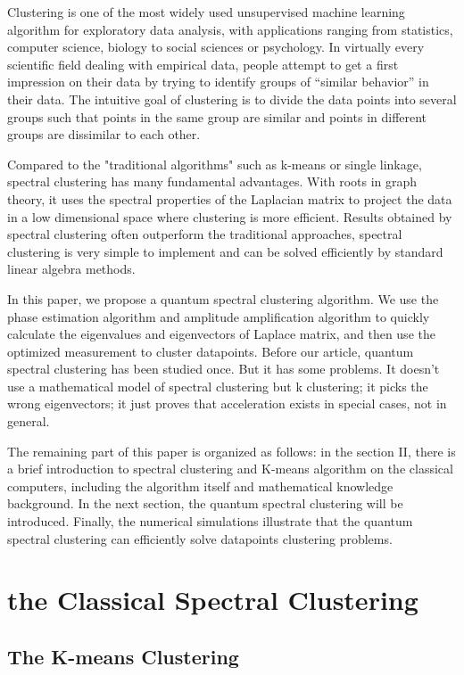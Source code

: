 \documentclass[onecolumn,notitlepage]{revtex4-1}
\begin{document}
Clustering is one of the most widely used unsupervised machine learning algorithm  for exploratory data analysis, with applications ranging from statistics, computer science, biology to social sciences or psychology. 
In virtually every scientific field dealing with empirical data, people attempt to get a first impression on their data by trying to identify groups of “similar behavior” in their data. 
The intuitive goal of clustering is to divide the data points into several groups such that points in the same group are similar and points in different groups are dissimilar to each other. 

Compared to the "traditional algorithms" such as k-means or single linkage, spectral clustering has many fundamental advantages. 
With roots in graph theory, it uses the spectral properties of the Laplacian matrix to project the data in a low dimensional space where clustering is more efficient. 
Results obtained by spectral clustering often outperform the traditional approaches, spectral clustering is very simple to implement and can be solved efficiently by standard linear algebra methods.

In this paper, we propose a quantum spectral clustering algorithm. We use the phase estimation algorithm and amplitude amplification algorithm to quickly calculate the eigenvalues and eigenvectors of Laplace matrix, and then use the optimized measurement to cluster datapoints. 
Before our article, quantum spectral clustering has been studied once. But it has some problems. It doesn't use a mathematical model of spectral clustering but k clustering; it picks the wrong eigenvectors; it just proves that acceleration exists in special cases, not in general.

The remaining part of this paper is organized as follows: in the section II, there is a brief introduction to spectral clustering and K-means algorithm on the classical computers, including the algorithm itself and mathematical knowledge background. In the next section, the quantum spectral clustering will be introduced. Finally, the numerical simulations illustrate that the quantum spectral clustering can efficiently solve datapoints clustering problems.


\section{the Classical Spectral Clustering}

\subsection{The K-means Clustering}
\end{document}

